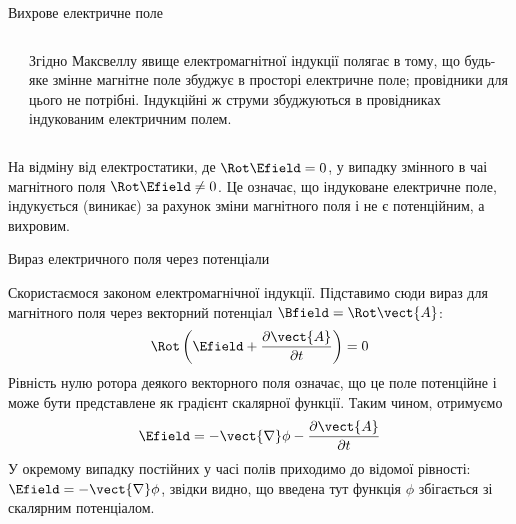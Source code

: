 \documentclass[onlytextwidth]{beamer}
\begin{document}
\begin{frame}{Вихрове електричне поле}{}
\begin{onlyenv}
\begin{columns}
\begin{column}{0.4\linewidth}
			\end{column}
			\begin{column}{0.6\linewidth}
				\begin{block}{}\justifying\small
					Згідно  Максвеллу \alert{явище електромагнітної індукції} полягає в тому, що будь-яке змінне магнітне поле збуджує в просторі
					електричне поле; провідники для цього не потрібні. Індукційні ж струми збуджуються в провідниках індукованим електричним полем.
				\end{block}
			\end{column}
		\end{columns}
		\begin{block}{}\justifying\small
			На відміну від електростатики, де $\Rot\Efield = 0$, у випадку змінного в чаі магнітного поля $ \Rot\Efield \neq 0$. Це означає, що
			індуковане
			електричне поле, індукується (виникає) за рахунок зміни магнітного поля і не є потенційним, а вихровим.
		\end{block}
	\end{onlyenv}
\end{frame}


\begin{frame}{Вираз електричного поля через потенціали}{}
	\begin{block}{}
		Скористаємося законом електромагнічної індукції. Підставимо
		сюди вираз для магнітного поля через векторний потенціал
		\(
		\Bfield=\Rot\vect{A}
		\):
		\begin{equation*}
			\Rot\left(\Efield  + \frac{\partial\vect{A}}{\partial t}\right) = 0
		\end{equation*}
		Рівність нулю ротора деякого векторного поля означає, що це
		поле потенційне і може бути представлене як градієнт скалярної
		функції. Таким чином, отримуємо
		\begin{equation*}
			\Efield = -\vect{\nabla}\phi - \frac{\partial\vect{A}}{\partial t}
		\end{equation*}
		У окремому випадку постійних у часі полів приходимо до відомої
		рівності: $\Efield = -\vect{\nabla}\phi $, звідки видно, що введена тут функція $\phi$
		збігається зі скалярним потенціалом.
	\end{block}
\end{frame}
\end{document}
